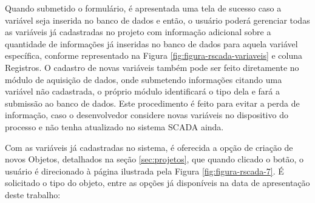 Quando submetido o formulário, é apresentada uma tela de sucesso caso a variável seja inserida no banco de dados e então, o usuário poderá gerenciar todas as variáveis já cadastradas no projeto com informação adicional sobre a quantidade de informações já inseridas no banco de dados para aquela variável específica, conforme representado na Figura \ref{fig:figura-rscada-variaveis} e coluna Registros. O cadastro de novas variáveis também pode ser feito diretamente no módulo de aquisição de dados, onde submetendo informações citando uma variável não cadastrada, o próprio módulo identificará o tipo dela e fará a submissão ao banco de dados. Este procedimento é feito para evitar a perda de informação, caso o desenvolvedor considere novas variáveis no dispositivo do processo e não tenha atualizado no sistema \gls{SCADA} ainda.

        \begin{figure}[!h]
    	\end{figure}

Com as variáveis já cadastradas no sistema, é oferecida a opção de criação de novos Objetos, detalhados na seção \ref{sec:projetos}, que quando clicado o botão, o usuário é direcionado à página ilustrada pela Figura \ref{fig:figura-rscada-7}. É solicitado o tipo do objeto, entre as opções já disponíveis na data de apresentação deste trabalho:

